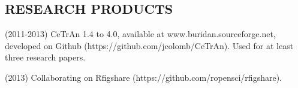 %

\newpage

%
\subsection*{RESEARCH PRODUCTS}



\begin{itemize}
\begin{sloppypar}
%
\item(2011-2013) CeTrAn 1.4 to 4.0, available at www.buridan.sourceforge.net,
developed on Github (https://github.com/jcolomb/CeTrAn).
Used for at least three research papers.

\item(2013) Collaborating on Rfigshare (https://github.com/ropensci/rfigshare).

%
%
\end{sloppypar}
\end{itemize}



